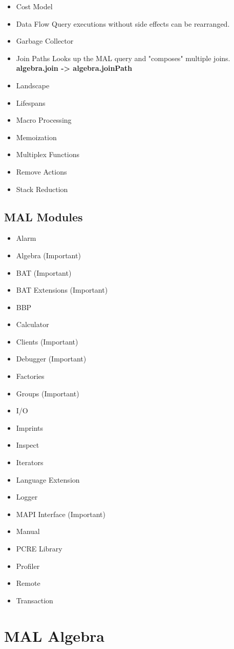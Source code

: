 \documentclass[11pt]{article}
\begin{document}
\begin{itemize}
\item Cost Model
\item Data Flow
Query executions without side effects can be rearranged.
\item Garbage Collector
\item Join Paths
Looks up the MAL query and "composes" multiple joins. \textbf{algebra.join -> algebra.joinPath}
\item Landscape
\item Lifespans
\item Macro Processing
\item Memoization
\item Multiplex Functions
\item Remove Actions
\item Stack Reduction
\end{itemize}

\subsection{MAL Modules}
\label{sec:org9cb0551}
\begin{itemize}
\item Alarm
\item Algebra (Important)
\item BAT (Important)
\item BAT Extensions (Important)
\item BBP
\item Calculator
\item Clients (Important)
\item Debugger (Important)
\item Factories
\item Groups (Important)
\item I/O
\item Imprints
\item Inspect
\item Iterators
\item Language Extension
\item Logger
\item MAPI Interface (Important)
\item Manual
\item PCRE Library
\item Profiler
\item Remote
\item Transaction
\end{itemize}


\section{MAL Algebra}
\label{sec:orga7a043d}
\end{document}
